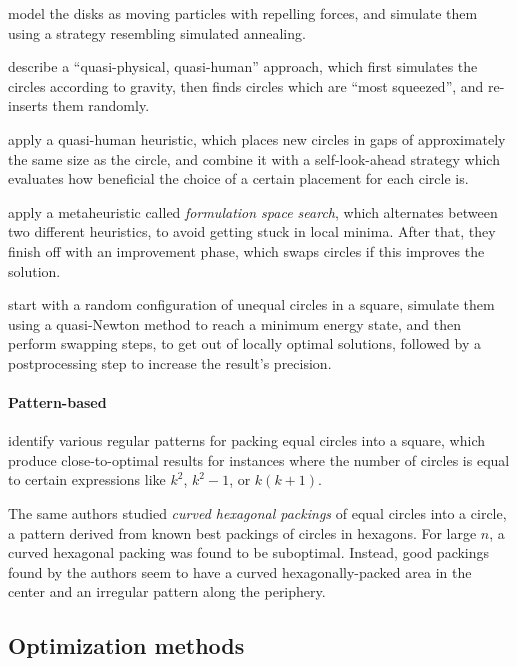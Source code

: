 \documentclass[a4paper,style=print,bibliography=totoc,nexus,lnum,extramargin]{tubsbook}
\begin{document}
\textcite{BDGL2000improving} model the disks as moving particles with repelling forces, and simulate them using a strategy resembling simulated annealing.

\textcite{WHZX2002improved} describe a “quasi-physical, quasi-human” approach, which first simulates the circles according to gravity, then finds circles which are “most squeezed”, and re-inserts them randomly.

\textcite{HLLX2006new} apply a quasi-human heuristic, which places new circles in gaps of approximately the same size as the circle, and combine it with a self-look-ahead strategy which evaluates how beneficial the choice of a certain placement for each circle is.

\textcite{LB2013packing} apply a metaheuristic called \emph{formulation space search}, which alternates between two different heuristics, to avoid getting stuck in local minima. After that, they finish off with an improvement phase, which swaps circles if this improves the solution.

\textcite{HHY2015action} start with a random configuration of unequal circles in a square, simulate them using a quasi-Newton method to reach a minimum energy state, and then perform swapping steps, to get out of locally optimal solutions, followed by a postprocessing step to increase the result's precision.

\paragraph{Pattern-based}

\textcite{GL1996repeated} identify various regular patterns for packing equal circles into a square, which produce close-to-optimal results for instances where the number of circles is equal to certain expressions like $k^2$, $k^2-1$, or $k(k+1)$.

The same authors \cite{lubachevsky1997curved} studied \emph{curved hexagonal packings} of equal circles into a circle, a pattern derived from known best packings of circles in hexagons. For large $n$, a curved hexagonal packing was found to be suboptimal. Instead, good packings found by the authors seem to have a curved hexagonally-packed area in the center and an irregular pattern along the periphery.

\subsection{Optimization methods}
\end{document}

